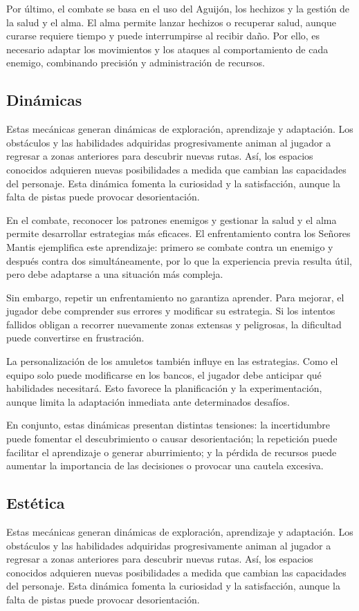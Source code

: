 \documentclass[12pt,a4paper]{article}
\begin{document}
Por último, el combate se basa en el uso del Aguijón, los hechizos y la gestión de la salud y el alma. El alma permite lanzar hechizos o recuperar salud, aunque curarse requiere tiempo y puede interrumpirse al recibir daño. Por ello, es necesario adaptar los movimientos y los ataques al comportamiento de cada enemigo, combinando precisión y administración de recursos.

\subsection{Dinámicas}
Estas mecánicas generan dinámicas de exploración, aprendizaje y adaptación. Los obstáculos y las habilidades adquiridas progresivamente animan al jugador a regresar a zonas anteriores para descubrir nuevas rutas. Así, los espacios conocidos adquieren nuevas posibilidades a medida que cambian las capacidades del personaje. Esta dinámica fomenta la curiosidad y la satisfacción, aunque la falta de pistas puede provocar desorientación.

En el combate, reconocer los patrones enemigos y gestionar la salud y el alma permite desarrollar estrategias más eficaces. El enfrentamiento contra los Señores Mantis ejemplifica este aprendizaje: primero se combate contra un enemigo y después contra dos simultáneamente, por lo que la experiencia previa resulta útil, pero debe adaptarse a una situación más compleja.

Sin embargo, repetir un enfrentamiento no garantiza aprender. Para mejorar, el jugador debe comprender sus errores y modificar su estrategia. Si los intentos fallidos obligan a recorrer nuevamente zonas extensas y peligrosas, la dificultad puede convertirse en frustración.

La personalización de los amuletos también influye en las estrategias. Como el equipo solo puede modificarse en los bancos, el jugador debe anticipar qué habilidades necesitará. Esto favorece la planificación y la experimentación, aunque limita la adaptación inmediata ante determinados desafíos.

En conjunto, estas dinámicas presentan distintas tensiones: la incertidumbre puede fomentar el descubrimiento o causar desorientación; la repetición puede facilitar el aprendizaje o generar aburrimiento; y la pérdida de recursos puede aumentar la importancia de las decisiones o provocar una cautela excesiva.

\subsection{Estética}
Estas mecánicas generan dinámicas de exploración, aprendizaje y adaptación. Los obstáculos y las habilidades adquiridas progresivamente animan al jugador a regresar a zonas anteriores para descubrir nuevas rutas. Así, los espacios conocidos adquieren nuevas posibilidades a medida que cambian las capacidades del personaje. Esta dinámica fomenta la curiosidad y la satisfacción, aunque la falta de pistas puede provocar desorientación.
\end{document}
